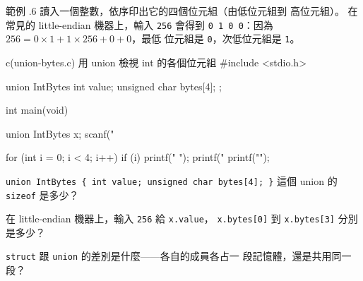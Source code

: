 \begin{center}
\label{fig:ch21-union-bytes}
\end{center}

範例 \thechapter.6 讀入一個整數，依序印出它的四個位元組（由低位元組到
高位元組）。 在常見的 little-endian 機器上，輸入 \texttt{256} 會得到
\texttt{0 1 0 0}：因為 $256 = 0 \times 1 + 1 \times 256 + 0 + 0$，最低
位元組是 \texttt{0}，次低位元組是 \texttt{1}。

\begin{example}{c}{(union-bytes.c) 用 union 檢視 int 的各個位元組}
#include <stdio.h>

union IntBytes {
    int value;
    unsigned char bytes[4];
};

int main(void) {
    union IntBytes x;
    scanf("%

    for (int i = 0; i < 4; i++) {
        if (i) {
            printf(" ");
        }
        printf("%
    }
    printf("\n");
}
\end{example}



\begin{drills}[label=drills:ext-union]
\item \texttt{union IntBytes \{ int value; unsigned char bytes[4]; \}}
這個 union 的 \texttt{sizeof} 是多少？
\item 在 little-endian 機器上，輸入 \texttt{256} 給 \texttt{x.value}，
\texttt{x.bytes[0]} 到 \texttt{x.bytes[3]} 分別是多少？
\item \texttt{struct} 跟 \texttt{union} 的差別是什麼——各自的成員各占一
段記憶體，還是共用同一段？
\end{drills}

